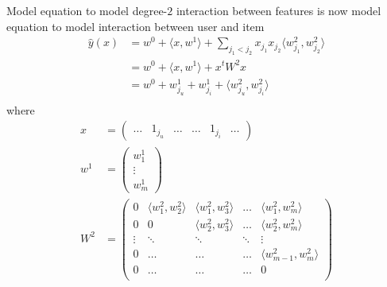 \documentclass[14pt, reqno]{amsart}
\theoremstyle{definition}
\begin{document}
Model equation to model degree-$2$ interaction between features is now model equation to model interaction between user and item
\begin{align*}
\hat{y}(x) & = w^0 + \langle x, w^1 \rangle + \sum\limits_{j_1 < j_2}  x_{j_1} x_{j_2} \langle w_{j_1}^2, w_{j_2}^2 \rangle \\
 & = w^0 + \langle x, w^1 \rangle + x^t W^2 x \\
 & = w^0 + w_{j_u}^1 + w_{j_i}^1  + \langle w_{j_u}^2, w_{j_i}^2 \rangle \\
\end{align*}
where
\begin{align*}
x & = \left( \begin{array}{cccccc} \dots & 1_{j_u} & \dots & \dots & 1_{j_i} & \dots \end{array} \right) \\
w^1 & = \left( \begin{array}{c} w_1^1 \\ \vdots \\ w_m^1 \end{array}\right) \\
W^2 & = \left( \begin{array}{ccccc}
0 & \langle w_1^2, w_2^2 \rangle & \langle w_1^2, w_3^2 \rangle & \dots & \langle w_1^2, w_m^2 \rangle \\
0 & 0 & \langle w_2^2, w_3^2 \rangle & \dots & \langle w_2^2, w_m^2 \rangle \\
\vdots & \ddots & \ddots & \ddots & \vdots \\
0 & \dots & \dots & \dots & \langle w_{m-1}^2, w_m^2 \rangle \\
0 & \dots & \dots & \dots & 0 \\
\end{array} \right)
\end{align*}
\end{document}
